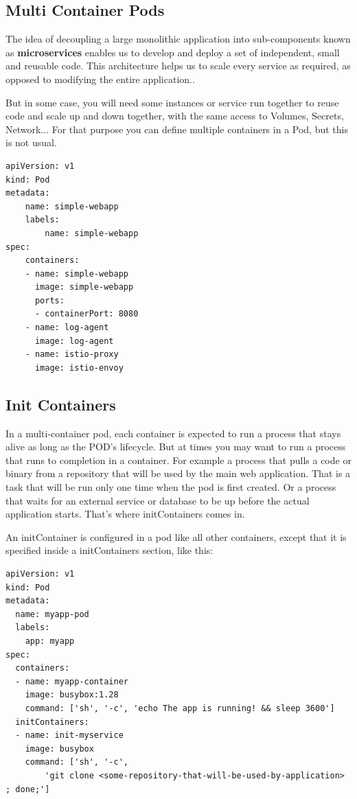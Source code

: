 \documentclass{article}
\newenvironment{codetemplate}[1][]{%
  \mybasecolorbox[#1]
  \itshape
}{%
  \endmybasecolorbox
}
\begin{document}
\subsection{Multi Container Pods}
The idea of decoupling a large monolithic application into sub-components known as \textbf{microservices} enables us to develop and deploy a set of independent, small and reusable code. This architecture helps us to scale every service as required, as opposed to modifying the entire application.. 

But in some case, you will need some instances or service run together to reuse code and scale up and down together, with the same access to Volumes, Secrets, Network... For that purpose you can define multiple containers in a Pod, but this is not usual.

\begin{codetemplate}{}
\begin{verbatim}
apiVersion: v1
kind: Pod
metadata:
    name: simple-webapp
    labels:
        name: simple-webapp
spec:
    containers:
    - name: simple-webapp
      image: simple-webapp
      ports:
      - containerPort: 8080
    - name: log-agent
      image: log-agent
    - name: istio-proxy
      image: istio-envoy
\end{verbatim}
\end{codetemplate}

\subsection{Init Containers}
In a multi-container pod, each container is expected to run a process that stays alive as long as the POD's lifecycle. But at times you may want to run a process that runs to completion in a container. For example a process that pulls a code or binary from a repository that will be used by the main web application. That is a task that will be run only  one time when the pod is first created. Or a process that waits  for an external service or database to be up before the actual application starts. That's where initContainers comes in.

An initContainer is configured in a pod like all other containers, except that it is specified inside a initContainers section,  like this:

\begin{codetemplate}{}
\begin{verbatim}
apiVersion: v1
kind: Pod
metadata:
  name: myapp-pod
  labels:
    app: myapp
spec:
  containers:
  - name: myapp-container
    image: busybox:1.28
    command: ['sh', '-c', 'echo The app is running! && sleep 3600']
  initContainers:
  - name: init-myservice
    image: busybox
    command: ['sh', '-c', 
        'git clone <some-repository-that-will-be-used-by-application> ; done;']
\end{verbatim}
\end{codetemplate}
\end{document}
